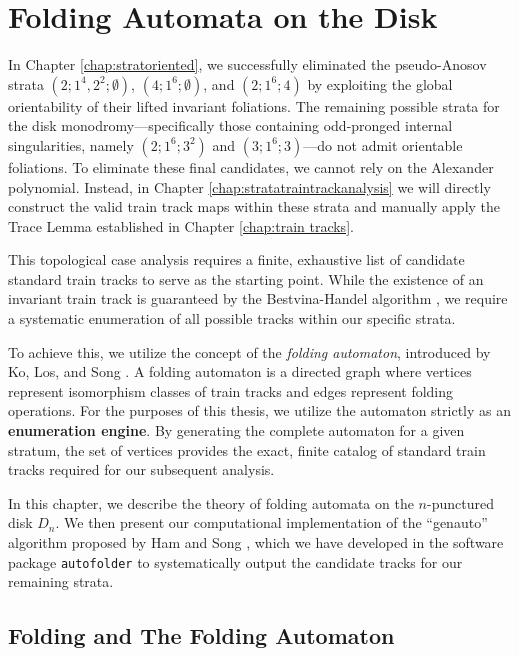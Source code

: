 \chapter{Folding Automata on the Disk}
\label{chap:folding_automata}

In Chapter \ref{chap:stratoriented}, we successfully eliminated the pseudo-Anosov strata $(2; 1^4, 2^2; \emptyset)$, $(4; 1^6; \emptyset)$, and $(2; 1^6; 4)$ by exploiting the global orientability of their lifted invariant foliations. The remaining possible strata for the disk monodromy---specifically those containing odd-pronged internal singularities, namely $(2; 1^6; 3^2)$ and $(3; 1^6; 3)$---do not admit orientable foliations. To eliminate these final candidates, we cannot rely on the Alexander polynomial. Instead, in Chapter \ref{chap:stratatraintrackanalysis} we will directly construct the valid train track maps within these strata and manually apply the Trace Lemma established in Chapter \ref{chap:train tracks}.

This topological case analysis requires a finite, exhaustive list of candidate standard train tracks to serve as the starting point. While the existence of an invariant train track is guaranteed by the Bestvina-Handel algorithm \cite{bestvina1995train}, we require a systematic enumeration of all possible tracks within our specific strata.

To achieve this, we utilize the concept of the \textit{folding automaton}, introduced by Ko, Los, and Song \cite{SongEntropy}. A folding automaton is a directed graph where vertices represent isomorphism classes of train tracks and edges represent folding operations. For the purposes of this thesis, we utilize the automaton strictly as an \textbf{enumeration engine}. By generating the complete automaton for a given stratum, the set of vertices provides the exact, finite catalog of standard train tracks required for our subsequent analysis.

In this chapter, we describe the theory of folding automata on the $n$-punctured disk $D_n$. We then present our computational implementation of the ``genauto'' algorithm proposed by Ham and Song \cite{HamSong2007}, which we have developed in the software package \texttt{autofolder} to systematically output the candidate tracks for our remaining strata.

\section{Folding and The Folding Automaton}
\label{sec:automaton_definition}


